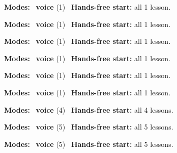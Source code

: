 \expandafter\def\csname hlchaptermodality159\endcsname{%
  {\small\noindent
    \textbf{Modes:} \hlvoicesign{}~\textbf{voice} (1)\quad
    \hlvoicesign{}~\textbf{Hands-free start:} all 1 lesson.%
    \par}\medskip
}

\expandafter\def\csname hlchaptermodality160\endcsname{%
  {\small\noindent
    \textbf{Modes:} \hlvoicesign{}~\textbf{voice} (1)\quad
    \hlvoicesign{}~\textbf{Hands-free start:} all 1 lesson.%
    \par}\medskip
}

\expandafter\def\csname hlchaptermodality161\endcsname{%
  {\small\noindent
    \textbf{Modes:} \hlvoicesign{}~\textbf{voice} (1)\quad
    \hlvoicesign{}~\textbf{Hands-free start:} all 1 lesson.%
    \par}\medskip
}

\expandafter\def\csname hlchaptermodality162\endcsname{%
  {\small\noindent
    \textbf{Modes:} \hlvoicesign{}~\textbf{voice} (1)\quad
    \hlvoicesign{}~\textbf{Hands-free start:} all 1 lesson.%
    \par}\medskip
}

\expandafter\def\csname hlchaptermodality163\endcsname{%
  {\small\noindent
    \textbf{Modes:} \hlvoicesign{}~\textbf{voice} (1)\quad
    \hlvoicesign{}~\textbf{Hands-free start:} all 1 lesson.%
    \par}\medskip
}

\expandafter\def\csname hlchaptermodality164\endcsname{%
  {\small\noindent
    \textbf{Modes:} \hlvoicesign{}~\textbf{voice} (1)\quad
    \hlvoicesign{}~\textbf{Hands-free start:} all 1 lesson.%
    \par}\medskip
}

\expandafter\def\csname hlchaptermodality165\endcsname{%
  {\small\noindent
    \textbf{Modes:} \hlvoicesign{}~\textbf{voice} (4)\quad
    \hlvoicesign{}~\textbf{Hands-free start:} all 4 lessons.%
    \par}\medskip
}

\expandafter\def\csname hlchaptermodality166\endcsname{%
  {\small\noindent
    \textbf{Modes:} \hlvoicesign{}~\textbf{voice} (5)\quad
    \hlvoicesign{}~\textbf{Hands-free start:} all 5 lessons.%
    \par}\medskip
}

\expandafter\def\csname hlchaptermodality167\endcsname{%
  {\small\noindent
    \textbf{Modes:} \hlvoicesign{}~\textbf{voice} (5)\quad
    \hlvoicesign{}~\textbf{Hands-free start:} all 5 lessons.%
    \par}\medskip
}

